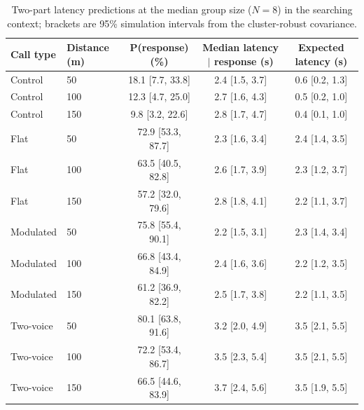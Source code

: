 \begin{table}[!ht]
\centering
\caption{Two-part latency predictions at the median group size ($N=8$) in the searching context; brackets are 95\% simulation intervals from the cluster-robust covariance.}
\label{tab:p3lat}
\footnotesize
\begin{tabular}{llccc}
\toprule
Call type & Distance (m) & P(response) (\%) & Median latency $|$ response (s) & Expected latency (s) \\
\midrule
Control & 50 & 18.1 [7.7, 33.8] & 2.4 [1.5, 3.7] & 0.6 [0.2, 1.3] \\
Control & 100 & 12.3 [4.7, 25.0] & 2.7 [1.6, 4.3] & 0.5 [0.2, 1.0] \\
Control & 150 & 9.8 [3.2, 22.6] & 2.8 [1.7, 4.7] & 0.4 [0.1, 1.0] \\
Flat & 50 & 72.9 [53.3, 87.7] & 2.3 [1.6, 3.4] & 2.4 [1.4, 3.5] \\
Flat & 100 & 63.5 [40.5, 82.8] & 2.6 [1.7, 3.9] & 2.3 [1.2, 3.7] \\
Flat & 150 & 57.2 [32.0, 79.6] & 2.8 [1.8, 4.1] & 2.2 [1.1, 3.7] \\
Modulated & 50 & 75.8 [55.4, 90.1] & 2.2 [1.5, 3.1] & 2.3 [1.4, 3.4] \\
Modulated & 100 & 66.8 [43.4, 84.9] & 2.4 [1.6, 3.6] & 2.2 [1.2, 3.5] \\
Modulated & 150 & 61.2 [36.9, 82.2] & 2.5 [1.7, 3.8] & 2.2 [1.1, 3.5] \\
Two-voice & 50 & 80.1 [63.8, 91.6] & 3.2 [2.0, 4.9] & 3.5 [2.1, 5.5] \\
Two-voice & 100 & 72.2 [53.4, 86.7] & 3.5 [2.3, 5.4] & 3.5 [2.1, 5.5] \\
Two-voice & 150 & 66.5 [44.6, 83.9] & 3.7 [2.4, 5.6] & 3.5 [1.9, 5.5] \\
\bottomrule
\end{tabular}
\end{table}